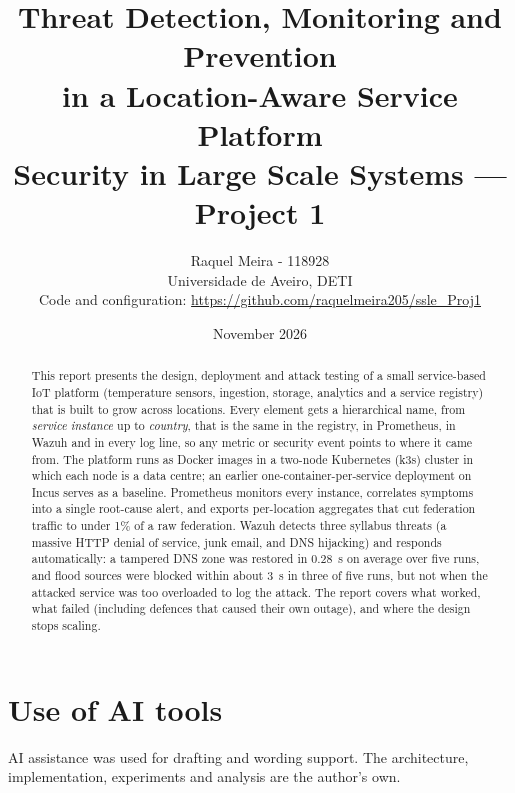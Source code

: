 \documentclass[11pt,a4paper]{article}
\title{Threat Detection, Monitoring and Prevention\\in a Location-Aware Service Platform\\[4pt]
  \large Security in Large Scale Systems --- Project 1}
\author{Raquel Meira - 118928\\
  Universidade de Aveiro, DETI\\[4pt]
  \small Code and configuration: \url{https://github.com/raquelmeira205/ssle_Proj1}}
\date{November 2026}
\begin{document}
\maketitle

\begin{abstract}
This report presents the design, deployment and attack testing of a small service-based IoT platform (temperature sensors,
ingestion, storage, analytics and a service registry) that is built to grow across locations. Every
element gets a hierarchical name, from \emph{service instance} up to \emph{country}, that is the
same in the registry, in Prometheus, in Wazuh and in every log line, so any metric or security event
points to where it came from. The platform runs as Docker images in a two-node Kubernetes (k3s)
cluster in which each node is a data centre; an earlier one-container-per-service deployment on
Incus serves as a baseline. Prometheus monitors every instance, correlates symptoms into a single
root-cause alert, and exports per-location aggregates that cut federation traffic to under 1\% of a
raw federation. Wazuh detects three syllabus threats (a massive HTTP denial of service, junk email,
and DNS hijacking) and responds automatically: a tampered DNS zone was restored in
0.28~s on average over five runs, and flood sources were blocked within about 3~s in three of five
runs, but not when the attacked service was too overloaded to log the attack. The report covers what worked,
what failed (including defences that caused their own outage), and where the design stops scaling.
\end{abstract}

\tableofcontents
\newpage









\section*{Use of AI tools}
AI assistance was used for drafting and wording support. The architecture, implementation,
experiments and analysis are the author's own.




\appendix

\end{document}
